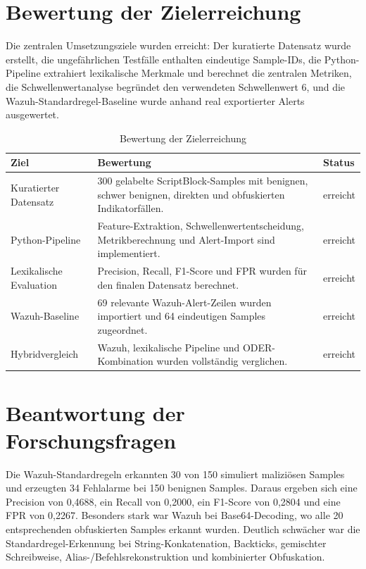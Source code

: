 \documentclass[12pt,a4paper,oneside,parskip=half]{scrreprt}
\begin{document}
\section{Bewertung der Zielerreichung}
Die zentralen Umsetzungsziele wurden erreicht: Der kuratierte Datensatz wurde erstellt, die ungefährlichen Testfälle enthalten eindeutige Sample-IDs, die Python-Pipeline extrahiert lexikalische Merkmale und berechnet die zentralen Metriken, die Schwellenwertanalyse begründet den verwendeten Schwellenwert 6, und die Wazuh-Standardregel-Baseline wurde anhand real exportierter Alerts ausgewertet.

\begin{table}[H]
\centering
\caption{Bewertung der Zielerreichung}
\small
\begin{tabularx}{\textwidth}{|L{4cm}|Y|L{2cm}|}
\hline
\textbf{Ziel} & \textbf{Bewertung} & \textbf{Status}\\
\hline
Kuratierter Datensatz & 300 gelabelte ScriptBlock-Samples mit benignen, schwer benignen, direkten und obfuskierten Indikatorfällen. & erreicht\\
\hline
Python-Pipeline & Feature-Extraktion, Schwellenwertentscheidung, Metrikberechnung und Alert-Import sind implementiert. & erreicht\\
\hline
Lexikalische Evaluation & Precision, Recall, F1-Score und FPR wurden für den finalen Datensatz berechnet. & erreicht\\
\hline
Wazuh-Baseline & 69 relevante Wazuh-Alert-Zeilen wurden importiert und 64 eindeutigen Samples zugeordnet. & erreicht\\
\hline
Hybridvergleich & Wazuh, lexikalische Pipeline und ODER-Kombination wurden vollständig verglichen. & erreicht\\
\hline
\end{tabularx}
\end{table}

\section{Beantwortung der Forschungsfragen}
Die Wazuh-Standardregeln erkannten 30 von 150 simuliert maliziösen Samples und erzeugten 34 Fehlalarme bei 150 benignen Samples. Daraus ergeben sich eine Precision von 0{,}4688, ein Recall von 0{,}2000, ein F1-Score von 0{,}2804 und eine FPR von 0{,}2267. Besonders stark war Wazuh bei Base64-Decoding, wo alle 20 entsprechenden obfuskierten Samples erkannt wurden. Deutlich schwächer war die Standardregel-Erkennung bei String-Konkatenation, Backticks, gemischter Schreibweise, Alias-/Befehlsrekonstruktion und kombinierter Obfuskation.
\end{document}
